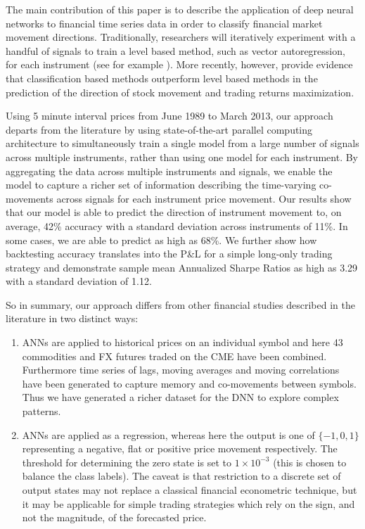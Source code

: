 \documentclass{article}
\begin{document}
The main contribution of this paper is to describe the application of deep neural networks to financial time series data in order to classify financial market movement directions. Traditionally, researchers will iteratively experiment with a handful of signals to train a level based method, such as vector autoregression, for each instrument (see for example \cite{Fkaastra95, Refenes1994, Trippi92}). More recently, however,  \cite{Leung2000} provide evidence that classification based methods outperform level based methods in the prediction of the direction of stock movement and trading returns maximization. 

Using 5 minute interval prices from June 1989 to March 2013,  our approach departs from the literature by using state-of-the-art parallel computing architecture to simultaneously train a single model from a large number of signals across multiple instruments, rather than using one model for each instrument.  By aggregating the data across multiple instruments and signals, we enable the model to capture a richer set of information describing the time-varying co-movements across signals for each instrument price movement. Our results show that our model is able to predict the direction of instrument movement to, on average, 42\% accuracy with a standard deviation across instruments of 11\%. In some cases, we are able to predict as high as 68\%. We further show how backtesting accuracy translates into the P\&L for a simple long-only trading strategy and demonstrate sample mean Annualized Sharpe Ratios as high as 3.29 with a standard deviation of 1.12. 

So in summary, our approach differs from other financial studies described in the literature in two distinct ways:

\begin{enumerate}
\item ANNs are applied to historical prices on an individual symbol and here 43 commodities and FX futures traded on the CME have been combined. Furthermore time series of lags, moving averages and moving correlations have been generated to capture memory and co-movements between symbols. Thus we have generated a richer dataset for the DNN to explore complex patterns.
\item ANNs are applied as a regression, whereas here the output is one of $\{-1,0,1\}$ representing a negative, flat or positive price movement respectively. The threshold for determining the zero state is set to $1\times10^{-3}$ (this is chosen to balance the class labels).  The caveat is that restriction to a discrete set of output states may not replace a classical financial econometric technique, but it may be applicable for simple trading strategies which rely on the sign, and not the magnitude, of the forecasted price.
\end{enumerate}
\end{document}
